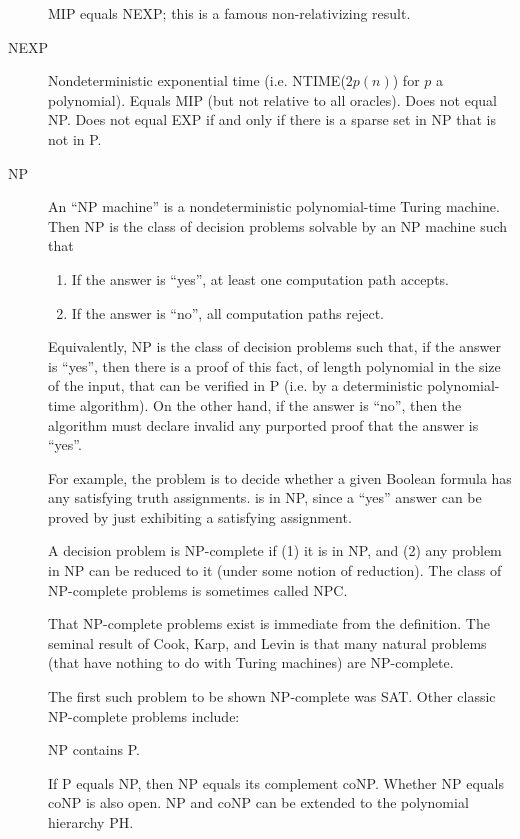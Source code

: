 \documentclass[a4paper]{article}
\newcommand{\cls}[1]{\rm{#1}}
\newcommand{\probl}[1]{\text{\textsc{#1}}}
\begin{document}
\begin{appendices}
\begin{description}
    MIP equals NEXP; this is a famous non-relativizing result.

  \item[\cls{NEXP}] Nondeterministic exponential time (i.e. \cls{NTIME($2p(n)$)} for $p$ a polynomial). Equals \cls{MIP} (but not relative to all oracles). Does not equal \cls{NP}. Does not equal \cls{EXP} if and only if there is a sparse set in \cls{NP} that is not in \cls{P}.

  \item[\cls{NP}] An ``NP machine'' is a nondeterministic polynomial-time Turing machine. Then \cls{NP} is the class of decision problems solvable by an \cls{NP} machine such that
    \begin{enumerate}
      \item If the answer is ``yes'', at least one computation path accepts.
      \item If the answer is ``no'', all computation paths reject.
    \end{enumerate}

    Equivalently, \cls{NP} is the class of decision problems such that, if the answer is ``yes'', then there is a proof of this fact, of length polynomial in the size of the input, that can be verified in \cls{P} (i.e. by a deterministic polynomial-time algorithm).  On the other hand, if the answer is ``no'', then the algorithm must declare invalid any purported proof that the answer is ``yes''.

    For example, the \probl{SAT} problem is to decide whether a given Boolean formula has any satisfying truth assignments. \probl{SAT} is in \cls{NP}, since a ``yes'' answer can be proved by just exhibiting a satisfying assignment.

    A decision problem is \cls{NP}-complete if (1) it is in \cls{NP}, and (2) any problem in \cls{NP} can be reduced to it (under some notion of reduction).  The class of \cls{NP}-complete problems is sometimes called \cls{NPC}.

    That \cls{NP}-complete problems exist is immediate from the definition.  The seminal result of Cook, Karp, and Levin is that many natural problems (that have nothing to do with Turing machines) are \cls{NP}-complete.

    The first such problem to be shown NP-complete was SAT.  Other classic NP-complete problems include:

    \cls{NP} contains \cls{P}.

    If \cls{P} equals \cls{NP}, then \cls{NP} equals its complement \cls{coNP}.  Whether \cls{NP} equals \cls{coNP} is also open.  \cls{NP} and \cls{coNP} can be extended to the polynomial hierarchy \cls{PH}.


\end{description}
\end{appendices}
\end{document}
